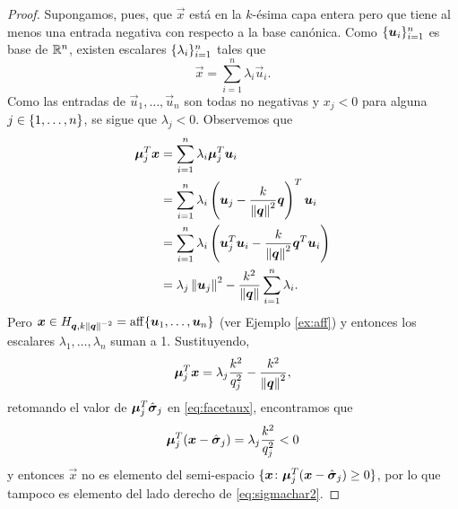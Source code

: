 \begin{proof}
	Supongamos, pues, que $\vec{x}$ está en la $k$-ésima capa entera pero que tiene al menos una
	entrada negativa con respecto a la base canónica. Como $\lbrace \boldsymbol{u}_i \rbrace_{i=1}^{n}$ es base de
	$\mathbb{R}^n$, existen escalares $\lbrace \lambda_i \rbrace_{i=1}^{n}$ tales que
	\begin{equation*}
		\vec{x} = \sum_{i=1}^{n}\lambda_i\vec{u}_i.
	\end{equation*}
	Como las entradas de $\vec{u}_1, \ldots, \vec{u}_n$ son todas no negativas y $x_j < 0$ para
	alguna $j \in \lbrace 1, \ldots, n \rbrace$, se sigue que $\lambda_j < 0$. Observemos que
	\begin{align*}
		\boldsymbol{\mu}_j^T\boldsymbol{x}
		&=
		\sum_{i=1}^{n}\lambda_i\boldsymbol{\mu}_j^T\boldsymbol{u}_i \\
		&=
		\sum_{i=1}^{n}\lambda_i\left(\boldsymbol{u}_j - \frac{k}{\left\lVert \boldsymbol{q} \right\rVert^2}\boldsymbol{q}\right)^T\boldsymbol{u}_i \\
		&=
		\sum_{i=1}^{n}\lambda_i\left(\boldsymbol{u}_j^T\boldsymbol{u}_i -
			\frac{k}{\left\lVert \boldsymbol{q} \right\rVert^2}\boldsymbol{q}^T\boldsymbol{u}_i\right) \\
		&=
		\lambda_j\left\lVert \boldsymbol{u}_j \right\rVert^2 - \frac{k^2}{\left\lVert \boldsymbol{q} \right\rVert} \sum_{i=1}^{n}\lambda_i.
	\end{align*}
	Pero $\boldsymbol{x} \in H_{\boldsymbol{q}, k\left\lVert \boldsymbol{q} \right\rVert^{-2}} = \operatorname{aff}\lbrace \boldsymbol{u}_1, \ldots, \boldsymbol{u}_n \rbrace$
	(ver Ejemplo \ref{ex:aff}) y entonces los escalares $\lambda_1, \ldots, \lambda_n$ suman a 1.
	Sustituyendo,
	\begin{equation*}
		\boldsymbol{\mu}_j^T\boldsymbol{x} = \lambda_j\frac{k^2}{q_j^2} - \frac{k^2}{\left\lVert \boldsymbol{q} \right\rVert^2},
	\end{equation*}
	retomando el valor de $\boldsymbol{\mu}_j^T\hat{\boldsymbol{ \sigma }}_j$ en \eqref{eq:facetaux}, encontramos que
	\begin{equation*}
		\boldsymbol{\mu}_j^T(\boldsymbol{x} - \hat{\boldsymbol{ \sigma }}_j) = \lambda_j\frac{k^2}{q_j^2} < 0
	\end{equation*}
	y entonces $\vec{x}$ no es elemento del semi-espacio $\lbrace \boldsymbol{x} \colon
	\boldsymbol{\mu}_j^T(\boldsymbol{x} - \hat{\boldsymbol{ \sigma }}_j) \geq 0 \rbrace$, por lo que tampoco es elemento del lado
	derecho de \eqref{eq:sigmachar2}.
\end{proof}

